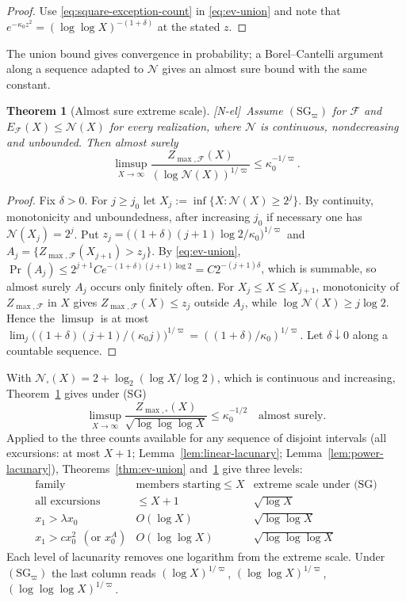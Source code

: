 \documentclass[11pt]{amsart}
\numberwithin{equation}{section}
\theoremstyle{plain}
\newtheorem{theorem}{Theorem}[section]
\theoremstyle{definition}
\theoremstyle{remark}
\newcommand{\F}{\mathcal{F}}
\newcommand{\tagNE}{\textup{[N-el]}}
\begin{document}
\begin{proof}
Use \eqref{eq:square-exception-count} in \eqref{eq:ev-union} and note that
$e^{-\kappa_0z^2}=(\log\log X)^{-(1+\delta)}$ at the stated $z$.
\end{proof}

The union bound gives convergence in probability; a Borel--Cantelli argument
along a sequence adapted to $\mathcal N$ gives an almost sure bound with the same
constant.

\begin{theorem}[Almost sure extreme scale]
\label{thm:ev-as}
\tagNE\ Assume $(\mathrm{SG}_\varpi)$ for $\F$ and $E_\F(X)\le \mathcal N(X)$ for every realization,
where $\mathcal N$ is continuous, nondecreasing and unbounded. Then almost surely
\[
\limsup_{X\to\infty}\frac{Z_{\max,\F}(X)}{(\log \mathcal N(X))^{1/\varpi}}\le \kappa_0^{-1/\varpi}.
\]
\end{theorem}

\begin{proof}
Fix $\delta>0$. For $j\ge j_0$ let $X_j:=\inf\{X:\mathcal N(X)\ge2^j\}$.
By continuity, monotonicity and unboundedness, after increasing $j_0$ if
necessary one has $\mathcal N(X_j)=2^j$. Put $z_j=\bigl((1+\delta)(j+1)\log2/\kappa_0\bigr)^{1/\varpi}$ and
$A_j=\{Z_{\max,\F}(X_{j+1})>z_j\}$. By \eqref{eq:ev-union},
$\Pr(A_j)\le2^{j+1}Ce^{-(1+\delta)(j+1)\log2}=C2^{-(j+1)\delta}$, which is
summable, so almost surely $A_j$ occurs only finitely often. For
$X_j\le X\le X_{j+1}$, monotonicity of $Z_{\max,\F}$ in $X$ gives
$Z_{\max,\F}(X)\le z_j$ outside $A_j$, while $\log \mathcal N(X)\ge j\log2$. Hence
the $\limsup$ is at most
$\lim_j\bigl((1+\delta)(j+1)/(\kappa_0j)\bigr)^{1/\varpi}=((1+\delta)/\kappa_0)^{1/\varpi}$. Let
$\delta\downarrow0$ along a countable sequence.
\end{proof}

With $\mathcal N_\square(X)=2+\log_2(\log X/\log2)$, which is continuous and
increasing, Theorem~\ref{thm:ev-as} gives under (SG)
\[
\limsup_{X\to\infty}\frac{Z_{\max,\square}(X)}{\sqrt{\log\log\log X}}\le \kappa_0^{-1/2}
\quad\text{almost surely.}
\]
Applied to the three counts available for any sequence of disjoint
intervals (all excursions: at most $X+1$; Lemma~\ref{lem:linear-lacunary};
Lemma~\ref{lem:power-lacunary}), Theorems~\ref{thm:ev-union}
and~\ref{thm:ev-as} give three levels:
\[
\begin{array}{c|c|c}
\text{family} & \text{members starting}\le X & \text{extreme scale under (SG)}\\
\hline
\text{all excursions} & \le X+1 & \sqrt{\log X}\\
x_1>\lambda x_0 & O(\log X) & \sqrt{\log\log X}\\
x_1>cx_0^2\ \ (\text{or }x_0^A) & O(\log\log X) & \sqrt{\log\log\log X}
\end{array}
\]
Each level of lacunarity removes one logarithm from the extreme scale.
Under $(\mathrm{SG}_\varpi)$ the last column reads $(\log X)^{1/\varpi}$,
$(\log\log X)^{1/\varpi}$, $(\log\log\log X)^{1/\varpi}$.
\end{document}
